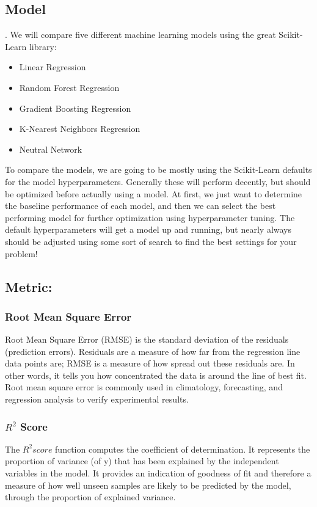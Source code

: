 \documentclass{article}
\begin{document}
\subsection*{Model}.
We will compare five different machine learning models using the great Scikit-Learn library:
\begin{itemize}
    \item Linear Regression
    \item Random Forest Regression
    \item Gradient Boosting Regression
    \item K-Nearest Neighbors Regression
    \item Neutral Network
\end{itemize}

To compare the models, we are going to be mostly using the Scikit-Learn defaults for the model hyperparameters. Generally these will perform decently, but should be optimized before actually using a model. At first, we just want to determine the baseline performance of each model, and then we can select the best performing model for further optimization using hyperparameter tuning. The default hyperparameters will get a model up and running, but nearly always should be adjusted using some sort of search to find the best settings for your problem!

\subsection*{Metric:}
\subsubsection*{Root Mean Square Error}
Root Mean Square Error (RMSE) is the standard deviation of the residuals (prediction errors). Residuals are a measure of how far from the regression line data points are; RMSE is a measure of how spread out these residuals are. In other words, it tells you how concentrated the data is around the line of best fit. Root mean square error is commonly used in climatology, forecasting, and regression analysis to verify experimental results.

\subsubsection*{$R^2$ Score}
The $R^2score$ function computes the coefficient of determination. It represents the proportion of variance (of y) that has been explained by the independent variables in the model. It provides an indication of goodness of fit and therefore a measure of how well unseen samples are likely to be predicted by the model, through the proportion of explained variance.
\end{document}
